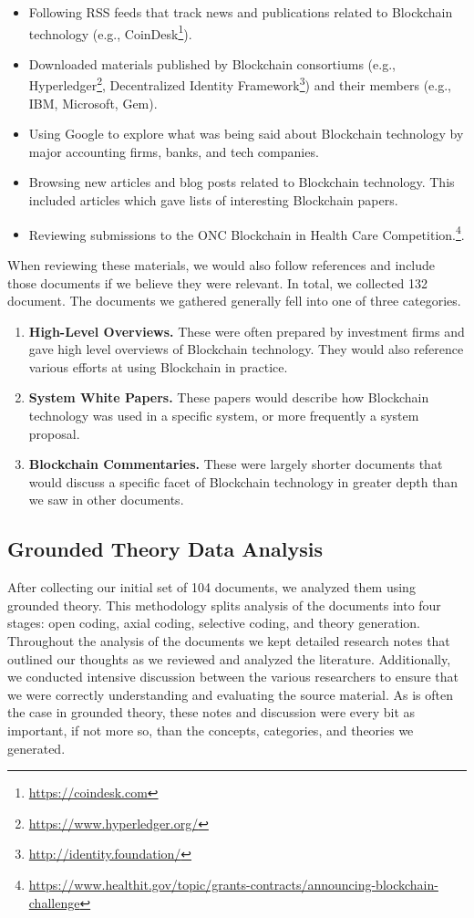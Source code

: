 \begin{itemize}
	\item Following RSS feeds that track news and publications related to Blockchain technology (e.g., CoinDesk\footnote{\url{https://coindesk.com}}).
	\item Downloaded materials published by Blockchain consortiums (e.g., Hyperledger\footnote{\url{https://www.hyperledger.org/}}, Decentralized Identity Framework\footnote{\url{http://identity.foundation/}}) and their members (e.g., IBM, Microsoft, Gem).
	\item Using Google to explore what was being said about Blockchain technology by major accounting firms, banks, and tech companies.
	\item Browsing new articles and blog posts related to Blockchain technology. This included articles which gave lists of interesting Blockchain papers.
	\item Reviewing submissions to the ONC Blockchain in Health Care Competition.\footnote{\url{https://www.healthit.gov/topic/grants-contracts/announcing-blockchain-challenge}}.
\end{itemize}

When reviewing these materials, we would also follow references and include those documents if we believe they were relevant.
In total, we collected 132 document.
The documents we gathered generally fell into one of three categories.

\begin{enumerate}
	\item \textbf{High-Level Overviews.} These were often prepared by investment firms and gave high level overviews of Blockchain technology. They would also reference various efforts at using Blockchain in practice.
	\item \textbf{System White Papers.} These papers would describe how Blockchain technology was used in a specific system, or more frequently a system proposal.
	\item \textbf{Blockchain Commentaries.} These were largely shorter documents that would discuss a specific facet of Blockchain technology in greater depth than we saw in other documents.
\end{enumerate}

\subsection{Grounded Theory Data Analysis}
After collecting our initial set of 104 documents, we analyzed them using grounded theory.
This methodology splits analysis of the documents into four stages: open coding, axial coding, selective coding, and theory generation.
Throughout the analysis of the documents we kept detailed research notes that outlined our thoughts as we reviewed and analyzed the literature.
Additionally, we conducted intensive discussion between the various researchers to ensure that we were correctly understanding and evaluating the source material.
As is often the case in grounded theory, these notes and discussion were every bit as important, if not more so, than the concepts, categories, and theories we generated.

